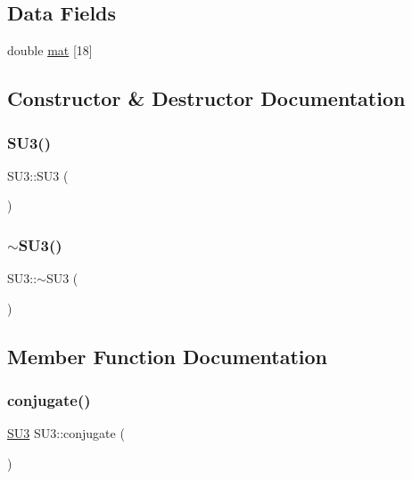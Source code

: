 \subsection*{Data Fields}
\begin{DoxyCompactItemize}
\item 
double \mbox{\hyperlink{class_s_u3_af003668305abe616f56568a075434be0}{mat}} \mbox{[}18\mbox{]}
\end{DoxyCompactItemize}


\subsection{Constructor \& Destructor Documentation}
\mbox{\label{class_s_u3_a79a4b45ff8cbe77f1f90a108971f822d}} 
\subsubsection{\texorpdfstring{SU3()}{SU3()}}
{\footnotesize\ttfamily S\+U3\+::\+S\+U3 (\begin{DoxyParamCaption}{ }\end{DoxyParamCaption})\hspace{0.3cm}{\ttfamily [inline]}}

\mbox{\label{class_s_u3_af1e314363e80a0404023494937c56afa}} 
\subsubsection{\texorpdfstring{$\sim$SU3()}{~SU3()}}
{\footnotesize\ttfamily S\+U3\+::$\sim$\+S\+U3 (\begin{DoxyParamCaption}{ }\end{DoxyParamCaption})\hspace{0.3cm}{\ttfamily [inline]}}



\subsection{Member Function Documentation}
\mbox{\label{class_s_u3_a1db359a1ede38fcf858876292a8c9c43}} 
\subsubsection{\texorpdfstring{conjugate()}{conjugate()}}
{\footnotesize\ttfamily \mbox{\hyperlink{class_s_u3}{S\+U3}} S\+U3\+::conjugate (\begin{DoxyParamCaption}{ }\end{DoxyParamCaption})}


